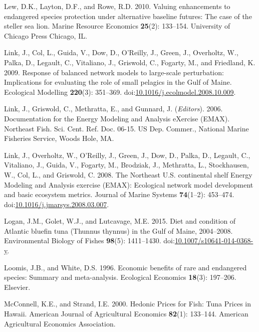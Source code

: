 \documentclass[]{article}
\begin{document}
\hypertarget{ref-lew2010valuing}{}
Lew, D.K., Layton, D.F., and Rowe, R.D. 2010. Valuing enhancements to
endangered species protection under alternative baseline futures: The
case of the steller sea lion. Marine Resource Economics \textbf{25}(2):
133--154. University of Chicago Press Chicago, IL.

\hypertarget{ref-link_response_2009}{}
Link, J., Col, L., Guida, V., Dow, D., O'Reilly, J., Green, J.,
Overholtz, W., Palka, D., Legault, C., Vitaliano, J., Griswold, C.,
Fogarty, M., and Friedland, K. 2009. Response of balanced network models
to large-scale perturbation: Implications for evaluating the role of
small pelagics in the Gulf of Maine. Ecological Modelling
\textbf{220}(3): 351--369.
doi:\href{https://doi.org/10.1016/j.ecolmodel.2008.10.009}{10.1016/j.ecolmodel.2008.10.009}.

\hypertarget{ref-link_documentation_2006}{}
Link, J., Griswold, C., Methratta, E., and Gunnard, J. (\emph{Editors}).
2006. Documentation for the Energy Modeling and Analysis eXercise
(EMAX). Northeast Fish. Sci. Cent. Ref. Doc. 06-15. US Dep. Commer.,
National Marine Fisheries Service, Woods Hole, MA.

\hypertarget{ref-link_northeast_2008}{}
Link, J., Overholtz, W., O'Reilly, J., Green, J., Dow, D., Palka, D.,
Legault, C., Vitaliano, J., Guida, V., Fogarty, M., Brodziak, J.,
Methratta, L., Stockhausen, W., Col, L., and Griswold, C. 2008. The
Northeast U.S. continental shelf Energy Modeling and Analysis exercise
(EMAX): Ecological network model development and basic ecosystem
metrics. Journal of Marine Systems \textbf{74}(1--2): 453--474.
doi:\href{https://doi.org/10.1016/j.jmarsys.2008.03.007}{10.1016/j.jmarsys.2008.03.007}.

\hypertarget{ref-logan_diet_2015}{}
Logan, J.M., Golet, W.J., and Lutcavage, M.E. 2015. Diet and condition
of Atlantic bluefin tuna (Thunnus thynnus) in the Gulf of Maine,
2004--2008. Environmental Biology of Fishes \textbf{98}(5): 1411--1430.
doi:\href{https://doi.org/10.1007/s10641-014-0368-y}{10.1007/s10641-014-0368-y}.

\hypertarget{ref-loomis1996economic}{}
Loomis, J.B., and White, D.S. 1996. Economic benefits of rare and
endangered species: Summary and meta-analysis. Ecological Economics
\textbf{18}(3): 197--206. Elsevier.

\hypertarget{ref-McConnell2000HedonicHawaii}{}
McConnell, K.E., and Strand, I.E. 2000. Hedonic Prices for Fish: Tuna
Prices in Hawaii. American Journal of Agricultural Economics
\textbf{82}(1): 133--144. American Agricultural Economics Association.
\end{document}
